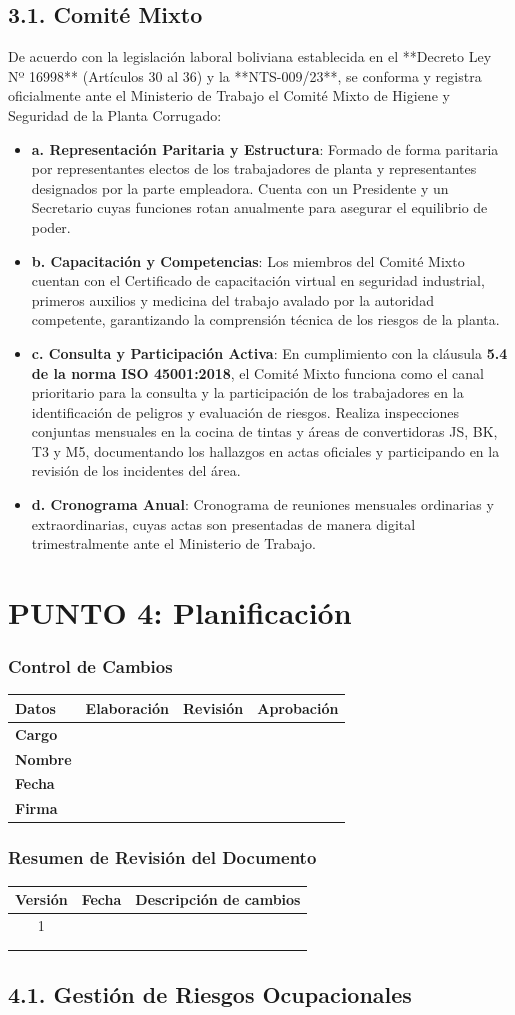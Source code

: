 \documentclass[11pt, letterpaper]{article}
\newcommand{\controlcambios}{
    \subsubsection*{Control de Cambios}
    \begin{table}[H]
        \centering
        \small
        \begin{tabular}{lp{4cm}p{4cm}p{4cm}}
            \toprule
            \textbf{Datos} & \textbf{Elaboración} & \textbf{Revisión} & \textbf{Aprobación} \\
            \midrule
            \textbf{Cargo} & & & \\
            \textbf{Nombre} & & & \\
            \textbf{Fecha} & & & \\
            \textbf{Firma} & & & \\
            \bottomrule
        \end{tabular}
    \end{table}
}
\newcommand{\resumenrevision}[1]{
    \subsubsection*{Resumen de Revisión del Documento}
    \begin{table}[H]
        \centering
        \small
        \begin{tabular}{ccp{8cm}}
            \toprule
            \textbf{Versión} & \textbf{Fecha} & \textbf{Descripción de cambios} \\
            \midrule
            #1 & & \\
            & & \\
            & & \\
            \bottomrule
        \end{tabular}
    \end{table}
}
\begin{document}
\subsection{3.1. Comité Mixto}
De acuerdo con la legislación laboral boliviana establecida en el **Decreto Ley Nº 16998** (Artículos 30 al 36) y la **NTS-009/23**, se conforma y registra oficialmente ante el Ministerio de Trabajo el Comité Mixto de Higiene y Seguridad de la Planta Corrugado:
\begin{itemize}
    \item \textbf{a. Representación Paritaria y Estructura}: Formado de forma paritaria por representantes electos de los trabajadores de planta y representantes designados por la parte empleadora. Cuenta con un Presidente y un Secretario cuyas funciones rotan anualmente para asegurar el equilibrio de poder.
    \item \textbf{b. Capacitación y Competencias}: Los miembros del Comité Mixto cuentan con el Certificado de capacitación virtual en seguridad industrial, primeros auxilios y medicina del trabajo avalado por la autoridad competente, garantizando la comprensión técnica de los riesgos de la planta.
    \item \textbf{c. Consulta y Participación Activa}: En cumplimiento con la cláusula \textbf{5.4 de la norma ISO 45001:2018}, el Comité Mixto funciona como el canal prioritario para la consulta y la participación de los trabajadores en la identificación de peligros y evaluación de riesgos. Realiza inspecciones conjuntas mensuales en la cocina de tintas y áreas de convertidoras JS, BK, T3 y M5, documentando los hallazgos en actas oficiales y participando en la revisión de los incidentes del área.
    \item \textbf{d. Cronograma Anual}: Cronograma de reuniones mensuales ordinarias y extraordinarias, cuyas actas son presentadas de manera digital trimestralmente ante el Ministerio de Trabajo.
\end{itemize}

\newpage
\section{PUNTO 4: Planificación}
\controlcambios
\resumenrevision{1}
\subsection{4.1. Gestión de Riesgos Ocupacionales}
\end{document}
